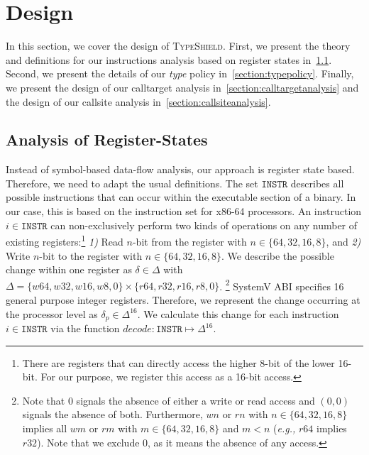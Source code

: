 \section{Design}
\label{chapter:Design}

In this section, we cover the design of \textsc{TypeShield}. First, we present the theory and definitions for our instructions analysis based on register states in~\cref{section:instructionanalysis}. Second, we present the details of our \emph{type} policy in~\cref{section:typepolicy}. Finally, we present the design of our calltarget analysis in~\cref{section:calltargetanalysis} and the design of our callsite analysis in~\cref{section:callsiteanalysis}.

\subsection{Analysis of Register-States}
\label{section:instructionanalysis}
Instead of symbol-based data-flow analysis, our approach is register state based. Therefore, we need to adapt the usual definitions.
The set $\texttt{INSTR}$ describes all possible instructions that can occur within the executable section of a binary. In our case,
this is based on the instruction set for x86-64 processors. An instruction $i \in \texttt{INSTR}$ can non-exclusively perform two kinds of operations on any number of existing registers:\footnote{There are registers that can directly access the higher 
8-bit of the lower 16-bit. For our purpose, we register this access as a 16-bit access.}
\textit{1)} Read $n$-bit from the register with $n \in \{ 64, 32, 16, 8 \}$, and 
\textit{2)} Write $n$-bit to the register with $n \in \{ 64, 32, 16, 8 \}$.
We describe the possible change within one register as $\delta \in \Delta$ with $\Delta = \{ w64, w32, w16, w8, 0 \} \times \{r64, r32, r16, r8, 0 \}$. \footnote{Note that 0 signals the absence of either a write or read access and $(0, 0)$ signals the absence of both. Furthermore, $wn$ or $rn$ with $n \in \{64,32,16,8\}$ implies all $wm$ or $rm$ with $m \in \{64,32,16,8\}$ and $m < n$ (\textit{e.g.,} $r64$ implies $r32$). Note that we exclude 0, as it means the absence of any access.}
SystemV ABI specifies 16 general purpose integer registers. Therefore, we represent the change occurring at the processor level as $\delta_p \in \Delta^{16}$. We calculate this change for each instruction $i \in \texttt{INSTR}$ via the function $decode : \texttt{INSTR} \mapsto \Delta^{16}$.


